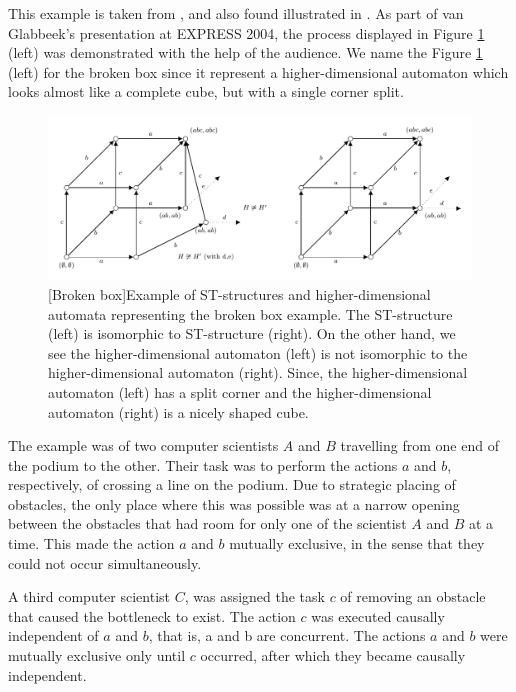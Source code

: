     \begin{example}\label{exp:hda-broken-box}
        This example is taken from \cite[Section 9.2.1]{Glabbeek06HDA}, and also found illustrated in \cite[Figure 6]{Johansen16STstruct}. As part of van Glabbeek's presentation at EXPRESS 2004, the process displayed in Figure \ref{fig:HDA-broken-box} (left) was demonstrated with the help of the audience. We name the Figure \ref{fig:HDA-broken-box} (left) for the broken box since it represent a higher-dimensional automaton which looks almost like a complete cube, but with a single corner split.
    
        \begin{figure}[ht]
            \centering
            \includegraphics[scale=0.9]{Figures/5.Relationship-with-other-models-of-true-concurrency/broken_box(figure_6_left)/HDA-broken-box.pdf}
            [Broken box]{Example of ST-structures and higher-dimensional automata representing the broken box example. The ST-structure (left) is isomorphic to ST-structure (right). On the other hand, we see the higher-dimensional automaton (left) is not isomorphic to the higher-dimensional automaton (right). Since, the higher-dimensional automaton (left) has a split corner and the higher-dimensional automaton (right) is a nicely shaped cube.}
            \label{fig:HDA-broken-box}
        \end{figure}
    
        The example was of two computer scientists $A$ and $B$ travelling from one end of the podium to the other. Their task was to perform the actions $a$ and $b$, respectively, of crossing a line on the podium. Due to strategic placing of obstacles, the only place where this was possible was at a narrow opening between the obstacles that had room for only one of the scientist $A$ and $B$ at a time. This made the action $a$ and $b$ mutually exclusive, in the sense that they could not occur simultaneously.
    
        A third computer scientist $C$, was assigned the task $c$ of removing an obstacle that caused the bottleneck to exist. The action $c$ was executed causally independent of $a$ and $b$, that is, a and b are concurrent. The actions $a$ and $b$ were mutually exclusive only until $c$ occurred, after which they became causally independent.
    

\end{example}
